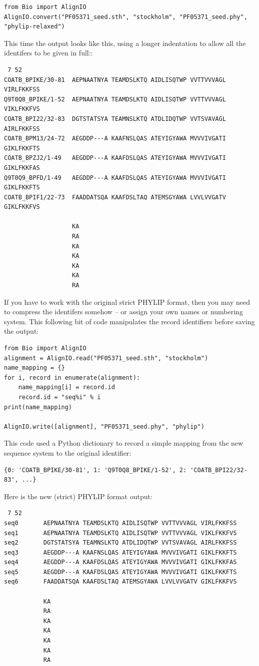 \documentclass{report}
\begin{document}
\begin{verbatim}
from Bio import AlignIO
AlignIO.convert("PF05371_seed.sth", "stockholm", "PF05371_seed.phy", "phylip-relaxed")
\end{verbatim}

This time the output looks like this, using a longer indentation to
allow all the identifers to be given in full::

\begin{verbatim}
 7 52
COATB_BPIKE/30-81  AEPNAATNYA TEAMDSLKTQ AIDLISQTWP VVTTVVVAGL VIRLFKKFSS
Q9T0Q8_BPIKE/1-52  AEPNAATNYA TEAMDSLKTQ AIDLISQTWP VVTTVVVAGL VIKLFKKFVS
COATB_BPI22/32-83  DGTSTATSYA TEAMNSLKTQ ATDLIDQTWP VVTSVAVAGL AIRLFKKFSS
COATB_BPM13/24-72  AEGDDP---A KAAFNSLQAS ATEYIGYAWA MVVVIVGATI GIKLFKKFTS
COATB_BPZJ2/1-49   AEGDDP---A KAAFDSLQAS ATEYIGYAWA MVVVIVGATI GIKLFKKFAS
Q9T0Q9_BPFD/1-49   AEGDDP---A KAAFDSLQAS ATEYIGYAWA MVVVIVGATI GIKLFKKFTS
COATB_BPIF1/22-73  FAADDATSQA KAAFDSLTAQ ATEMSGYAWA LVVLVVGATV GIKLFKKFVS

                   KA
                   RA
                   KA
                   KA
                   KA
                   KA
                   RA
\end{verbatim}

If you have to work with the original strict PHYLIP format, then you may need to
compress the identifers somehow -- or assign your own names or numbering system.
This following bit of code manipulates the record identifiers before saving the output:

\begin{verbatim}
from Bio import AlignIO
alignment = AlignIO.read("PF05371_seed.sth", "stockholm")
name_mapping = {}
for i, record in enumerate(alignment):
    name_mapping[i] = record.id
    record.id = "seq%i" % i
print(name_mapping)

AlignIO.write([alignment], "PF05371_seed.phy", "phylip")
\end{verbatim}

\noindent This code used a Python dictionary to record a simple mapping from the new sequence system to the original identifier:
\begin{verbatim}
{0: 'COATB_BPIKE/30-81', 1: 'Q9T0Q8_BPIKE/1-52', 2: 'COATB_BPI22/32-83', ...}
\end{verbatim}

\noindent Here is the new (strict) PHYLIP format output:
\begin{verbatim}
 7 52
seq0       AEPNAATNYA TEAMDSLKTQ AIDLISQTWP VVTTVVVAGL VIRLFKKFSS
seq1       AEPNAATNYA TEAMDSLKTQ AIDLISQTWP VVTTVVVAGL VIKLFKKFVS
seq2       DGTSTATSYA TEAMNSLKTQ ATDLIDQTWP VVTSVAVAGL AIRLFKKFSS
seq3       AEGDDP---A KAAFNSLQAS ATEYIGYAWA MVVVIVGATI GIKLFKKFTS
seq4       AEGDDP---A KAAFDSLQAS ATEYIGYAWA MVVVIVGATI GIKLFKKFAS
seq5       AEGDDP---A KAAFDSLQAS ATEYIGYAWA MVVVIVGATI GIKLFKKFTS
seq6       FAADDATSQA KAAFDSLTAQ ATEMSGYAWA LVVLVVGATV GIKLFKKFVS

           KA
           RA
           KA
           KA
           KA
           KA
           RA
\end{verbatim}
\end{document}
